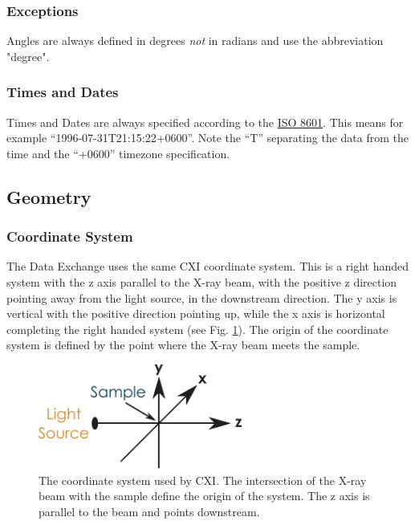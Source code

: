 \subsubsection{Exceptions}
Angles are always defined in degrees {\em not} in radians and use the abbreviation "degree".

\subsubsection{Times and Dates} 
Times and Dates are always specified according to the \href{http://www.w3.org/TR/NOTE-datetime}{ISO 8601}.  This means for example ``1996-07-31T21:15:22+0600''. Note the ``T'' separating the data from the time and the ``+0600'' timezone specification.

\clearpage
\subsection{Geometry}
\subsubsection{Coordinate System}

The Data Exchange uses the same CXI coordinate system. This is a right handed system with the z axis parallel to the X-ray beam, with the positive z direction pointing away from the light source, in the downstream direction. The y axis is vertical with the positive direction pointing up, while the x axis is horizontal completing the right handed system (see Fig. \ref{fig:CoordSystem}). The origin of the coordinate system is defined by the point where the X-ray beam meets the sample.

\begin{figure}[h!]
\centering
\includegraphics[width=0.6\textwidth]{figures/dx_CoordSystem.pdf}
\caption{The coordinate system used by CXI. The intersection of the X-ray beam with the sample define the  origin of the system. The z axis is parallel to the beam and points downstream.}
\label{fig:CoordSystem}
\end{figure}

